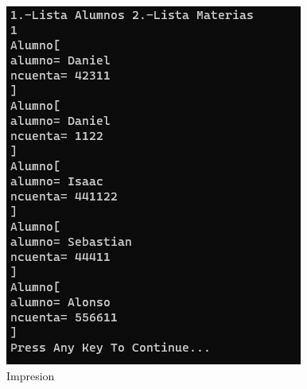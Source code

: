 \documentclass{report}
\begin{document}
\begin{figure}[h]
    \centering
    \includegraphics[width=1\linewidth]{Imagen10.png}
    \caption{Impresion}
    
\end{figure}
\end{document}
